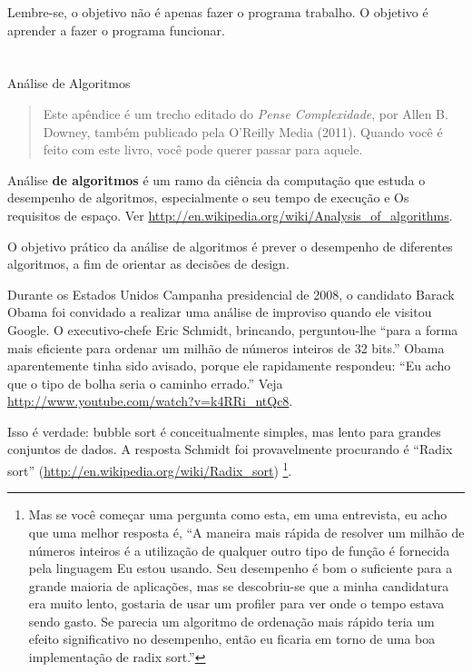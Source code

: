 \documentclass[10pt]{book}
\begin{document}
\begin{exercise}
\begin{v erbatim}
Lembre-se, o objetivo não é apenas fazer o programa
trabalho. O objetivo é aprender a fazer o programa funcionar.


\chapter{} Análise de Algoritmos

\begin{quote}
Este apêndice é um trecho editado do {\it Pense Complexidade}, por
Allen B. Downey, também publicado pela O'Reilly Media (2011). Quando você
é feito com este livro, você pode querer passar para aquele.
\end{quote}

{Análise \bf de algoritmos} é um ramo da ciência da computação que
estuda o desempenho de algoritmos, especialmente o seu tempo de execução e
Os requisitos de espaço. Ver
\url{http://en.wikipedia.org/wiki/Analysis_of_algorithms}.
 

O objetivo prático da análise de algoritmos é prever o desempenho
de diferentes algoritmos, a fim de orientar as decisões de design.

Durante os Estados Unidos Campanha presidencial de 2008, o candidato
Barack Obama foi convidado a realizar uma análise de improviso quando
ele visitou Google. O executivo-chefe Eric Schmidt, brincando, perguntou-lhe
``para a forma mais eficiente para ordenar um milhão de números inteiros de 32 bits.''
Obama aparentemente tinha sido avisado, porque ele rapidamente
respondeu: ``Eu acho que o tipo de bolha seria o caminho errado.''
Veja \url{http://www.youtube.com/watch?v=k4RRi_ntQc8}.

Isso é verdade: bubble sort é conceitualmente simples, mas lento para
grandes conjuntos de dados. A resposta Schmidt foi provavelmente procurando é
``Radix sort'' (\url{http://en.wikipedia.org/wiki/Radix_sort}) \footnote {
Mas se você começar uma pergunta como esta, em uma entrevista, eu acho que
uma melhor resposta é, ``A maneira mais rápida de resolver um milhão de números inteiros
é a utilização de qualquer outro tipo de função é fornecida pela linguagem
Eu estou usando. Seu desempenho é bom o suficiente para a grande maioria
de aplicações, mas se descobriu-se que a minha candidatura era muito
lento, gostaria de usar um profiler para ver onde o tempo estava sendo
gasto. Se parecia um algoritmo de ordenação mais rápido teria
um efeito significativo no desempenho, então eu ficaria
em torno de uma boa implementação de radix sort.''}.


\end{v erbatim}
\end{exercise}
\end{document}
